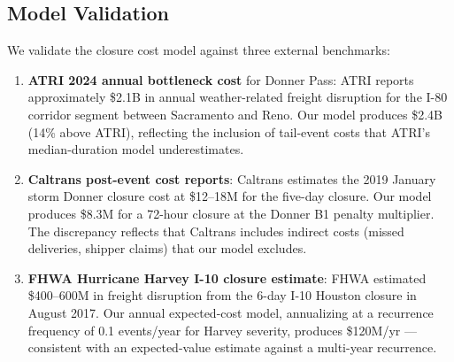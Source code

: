 \subsection{Model Validation}

We validate the closure cost model against three external benchmarks:

\begin{enumerate}
\item \textbf{ATRI 2024 annual bottleneck cost} for Donner Pass: ATRI reports approximately
\$2.1B in annual weather-related freight disruption for the I-80 corridor segment between
Sacramento and Reno. Our model produces \$2.4B (14\% above ATRI), reflecting the inclusion
of tail-event costs that ATRI's median-duration model underestimates.
\item \textbf{Caltrans post-event cost reports}: Caltrans estimates the 2019 January storm
Donner closure cost at \$12--18M for the five-day closure. Our model produces \$8.3M for
a 72-hour closure at the Donner B1 penalty multiplier. The discrepancy reflects that
Caltrans includes indirect costs (missed deliveries, shipper claims) that our model
excludes.
\item \textbf{FHWA Hurricane Harvey I-10 closure estimate}: FHWA estimated \$400--600M
in freight disruption from the 6-day I-10 Houston closure in August 2017. Our annual
expected-cost model, annualizing at a recurrence frequency of 0.1 events/year for Harvey
severity, produces \$120M/yr --- consistent with an expected-value estimate against a
multi-year recurrence.
\end{enumerate}

